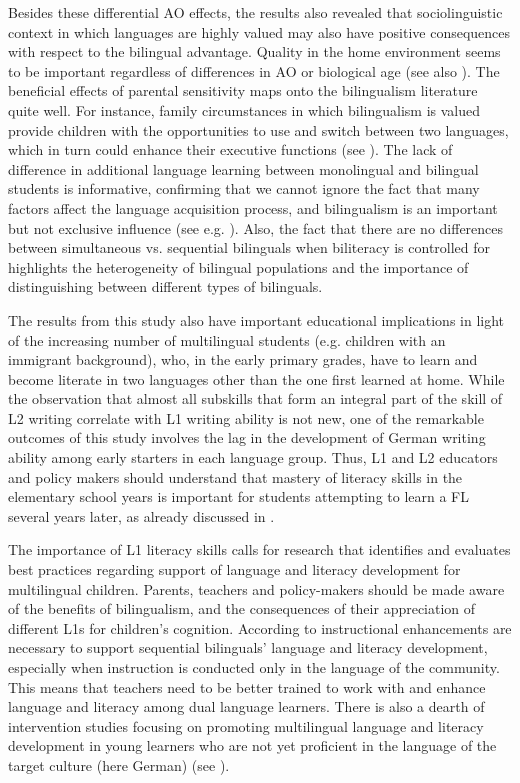 \documentclass[output=paper,modfonts,nonflat,newtxmath]{langsci/langscibook}
\begin{document}
Besides these differential AO effects, the results also revealed that sociolinguistic context in which languages are highly valued may also have positive consequences with respect to the bilingual advantage. Quality in the home environment seems to be important regardless of differences in AO or biological age (see also \citealt{PfenningerSingleton2019}). The beneficial effects of parental sensitivity maps onto the bilingualism literature quite well. For instance, family circumstances in which bilingualism is valued provide children with the opportunities to use and switch between two languages, which in turn could enhance their executive functions (see \citealt{GoriotEtAl2016}). The lack of difference in additional language learning between monolingual and bilingual students is informative, confirming that we cannot ignore the fact that many factors affect the language acquisition process, and bilingualism is an important but not exclusive influence (see e.g. \citealt{Cenoz2009}). Also, the fact that there are no differences between simultaneous vs. sequential bilinguals when biliteracy is controlled for highlights the heterogeneity of bilingual populations and the importance of distinguishing between different types of bilinguals.

The results from this study also have important educational implications in light of the increasing number of multilingual students (e.g. children with an immigrant background), who, in the early primary grades, have to learn and become literate in two languages other than the one first learned at home. While the observation that almost all subskills that form an integral part of the skill of L2 writing correlate with L1 writing ability is not new, one of the remarkable outcomes of this study involves the lag in the development of German writing ability among early starters in each language group. Thus, L1 and L2 educators and policy makers should understand that mastery of literacy skills in the elementary school years is important for students attempting to learn a FL several years later, as already discussed in \citet{Pfenninger2014}.

The importance of L1 literacy skills calls for research that identifies and evaluates best practices regarding support of language and literacy development for multilingual children. Parents, teachers and policy-makers should be made aware of the benefits of bilingualism, and the consequences of their appreciation of different L1s for children’s cognition. According to \citet{GoldenbergEtAl2006} instructional enhancements are necessary to support sequential bilinguals’ language and literacy development, especially when instruction is conducted only in the language of the community. This means that teachers need to be better trained to work with and enhance language and literacy among dual language learners. There is also a dearth of intervention studies focusing on promoting multilingual language and literacy development in young learners who are not yet proficient in the language of the target culture (here German) (see \citealt{AugustShanahan2006}).
\end{document}
